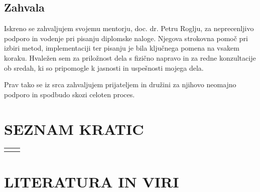 \documentclass[12pt,a4paper,titlepage,openany]{report}
\newcommand{\uppercaseChapter}[1]{\chapter{\MakeUppercase{#1}}}
\begin{document}

\newpage
\section*{Zahvala}
Iskreno se zahvaljujem svojemu mentorju, doc. dr. Petru Roglju, za neprecenljivo podporo in vodenje pri pisanju diplomske naloge. Njegova strokovna pomoč pri izbiri metod, implementaciji ter pisanju je bila ključnega pomena na vsakem koraku. Hvaležen sem za priložnost dela s fizično napravo in za redne konzultacije ob sredah, ki so pripomogle k jasnosti in uspešnosti mojega dela.

Prav tako se iz srca zahvaljujem prijateljem in družini za njihovo neomajno podporo in spodbudo skozi celoten proces.

\newpage

\tableofcontents
{}
\newpage
\listoftables
{}
\newpage
\listoffigures
{}
\newpage

\chapter*{SEZNAM KRATIC}

\thispagestyle{fancyplain}
\begin{longtable}{@{}p{2cm}@{}p{\dimexpr\textwidth-2cm\relax}@{}}

\nomenclature{$EEG$}{elektroencefalografija}
\nomenclature{$MMID$}{Motor Movement/Imagery Dataset} 
\nomenclature{$PLI$}{phase lag index}
\nomenclature{$wPLI$}{weighted phase lag index}
\nomenclature{$k-NN$}{k nearest neighbours}
\nomenclature{$SVM$}{support vector machine}
\nomenclature{$CPCC$}{complex Pearson correlation coefficient}
\nomenclature{$GC$}{Granger causality}

\end{longtable}
\newpage

\normalsize


% 
% 









\uppercaseChapter{Literatura in viri}
\thispagestyle{fancy}
\printbibliography[title={~}]
\end{document}
